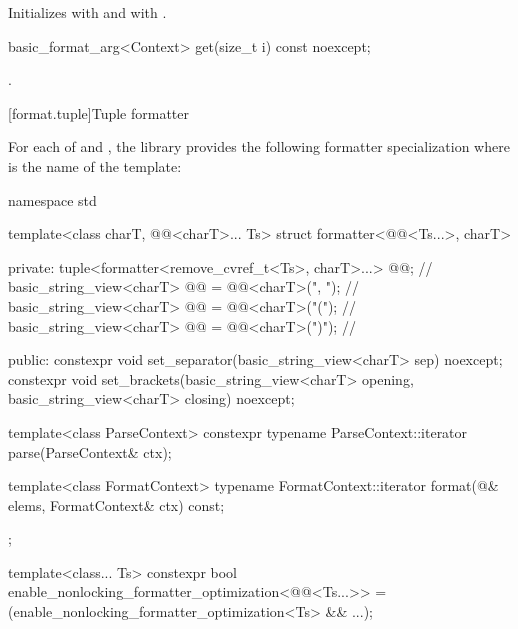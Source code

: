 \begin{itemdescr}
\pnum
\effects
Initializes
 with  and
 with .
\end{itemdescr}

%
\begin{itemdecl}
basic_format_arg<Context> get(size_t i) const noexcept;
\end{itemdecl}

\begin{itemdescr}
\pnum
\returns
{}.
\end{itemdescr}

[format.tuple]{Tuple formatter}

\pnum
For each of  and ,
the library provides the following formatter specialization
where  is the name of the template:

%
\begin{codeblock}
namespace std {
  template<class charT, @@<charT>... Ts>
  struct formatter<@@<Ts...>, charT> {
  private:
    tuple<formatter<remove_cvref_t<Ts>, charT>...> @@;               // \expos
    basic_string_view<charT> @@ = @@<charT>(", ");      // \expos
    basic_string_view<charT> @@ = @@<charT>("("); // \expos
    basic_string_view<charT> @@ = @@<charT>(")"); // \expos

  public:
    constexpr void set_separator(basic_string_view<charT> sep) noexcept;
    constexpr void set_brackets(basic_string_view<charT> opening,
                                basic_string_view<charT> closing) noexcept;

    template<class ParseContext>
      constexpr typename ParseContext::iterator
        parse(ParseContext& ctx);

    template<class FormatContext>
      typename FormatContext::iterator
        format(@\seebelow@& elems, FormatContext& ctx) const;
  };

  template<class... Ts>
    constexpr bool enable_nonlocking_formatter_optimization<@@<Ts...>> =
      (enable_nonlocking_formatter_optimization<Ts> && ...);
}
\end{codeblock}

